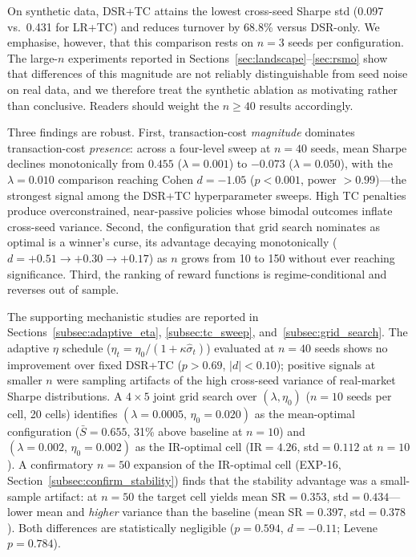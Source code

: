 \documentclass[conference]{IEEEtran}
\begin{document}
On synthetic data, DSR+TC attains the lowest cross-seed Sharpe std
(0.097 vs.\ 0.431 for LR+TC) and reduces turnover by 68.8\% versus
DSR-only. We emphasise, however, that this comparison rests on $n=3$
seeds per configuration. The large-$n$ experiments reported in
Sections~\ref{sec:landscape}--\ref{sec:rsmo} show that differences of
this magnitude are not reliably distinguishable from seed noise on real
data, and we therefore treat the synthetic ablation as motivating rather
than conclusive. Readers should weight the $n\geq40$ results
accordingly.

Three findings are robust. First, transaction-cost \emph{magnitude}
dominates transaction-cost \emph{presence}: across a four-level sweep at
$n=40$ seeds, mean Sharpe declines monotonically from $0.455$
($\lambda=0.001$) to $-0.073$ ($\lambda=0.050$), with the
$\lambda=0.010$ comparison reaching Cohen $d=-1.05$ ($p<0.001$, power
$>0.99$)---the strongest signal among the DSR+TC hyperparameter
sweeps. High TC
penalties produce overconstrained, near-passive policies whose bimodal
outcomes inflate cross-seed variance. Second, the configuration that
grid search nominates as optimal is a winner's curse, its advantage
decaying monotonically ($d=+0.51 \to +0.30 \to +0.17$) as $n$ grows from
10 to 150 without ever reaching significance. Third, the ranking of
reward functions is regime-conditional and reverses out of sample.

The supporting mechanistic studies are reported in
Sections~\ref{subsec:adaptive_eta}, \ref{subsec:tc_sweep},
and~\ref{subsec:grid_search}.
The adaptive $\eta$ schedule
($\eta_t = \eta_0/(1+\kappa\hat{\sigma}_t)$) evaluated at $n=40$
seeds shows no improvement over fixed DSR+TC ($p>0.69$, $|d|<0.10$);
positive signals at smaller $n$ were sampling artifacts of the
high cross-seed variance of real-market Sharpe distributions.
A $4\times 5$ joint grid search over
$(\lambda, \eta_0)$ ($n=10$ seeds per cell, 20 cells)
identifies $(\lambda=0.0005,\,\eta_0=0.020)$ as the mean-optimal
configuration ($\bar{S}=0.655$, 31\% above baseline at $n=10$) and
$(\lambda=0.002,\,\eta_0=0.002)$ as the IR-optimal cell
(IR$=4.26$, std$=0.112$ at $n=10$). A confirmatory $n=50$
expansion of the IR-optimal cell (EXP-16,
Section~\ref{subsec:confirm_stability}) finds that the stability
advantage was a small-sample artifact: at $n=50$ the target cell
yields mean SR$=0.353$, std$=0.434$---lower mean and
\emph{higher} variance than the baseline (mean SR$=0.397$,
std$=0.378$). Both differences are statistically negligible
($p=0.594$, $d=-0.11$; Levene $p=0.784$).
\end{document}
